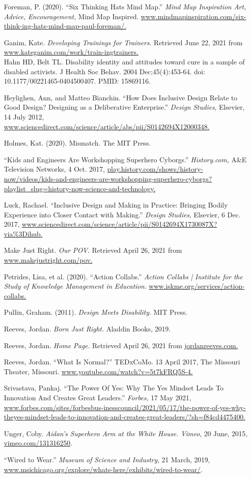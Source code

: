 \documentclass[11.5pt]{sig-alternate} %
\begin{document}
Foreman, P. (2020). “Six Thinking Hats Mind Map.” \textit{Mind Map Inspiration Art, Advice,  Encouragement,} Mind Map Inspired. \url{www.mindmapinspiration.com/six-think-ing-hats-mind-map-paul-foreman/.}

Ganim, Kate. \textit{Developing Trainings for Trainers.} Retrieved June 22, 2021 from \url{www.kateganim.com/work/train-ingtrainers.}\\

Hahn HD, Belt TL. Disability identity and attitudes toward cure in a sample of disabled activists. J Health Soc Behav. 2004 Dec;45(4):453-64. doi: 10.1177/00221465-0404500407. PMID: 15869116.

Heylighen, Ann, and Matteo Bianchin. “How Does Inclusive Design Relate to Good Design? Designing as a Deliberative Enterprise.” \textit{Design Studies,} Elsevier, 14 July 2012, \url{www.sciencedirect.com/science/article/abs/pii/S0142694X12000348.}

Holmes, Kat. (2020). Mismatch. The MIT Press. 

“Kids and Engineers Are Workshopping Superhero Cyborgs.” \textit{History.com,} A\&E Television Networks, 4 Oct. 2017, \url{play.history.com/shows/history-now/videos/kids-and-engineers-are-workshopping-superhero-cyborgs?playlist\_slug=history-now-science-and-technology.}

Luck, Rachael. “Inclusive Design and Making in Practice: Bringing Bodily Experience into Closer Contact with Making.” \textit{Design Studies,} Elsevier, 6 Dec. 2017, \url{www.sciencedirect.com/science/article/pii/S0142694X1730087X?via\%3Dihub.}

Make Just Right. \textit{Our POV.} Retrieved April 26, 2021 from \url{www.makejustright.com/pov.}

Petrides, Lisa, et al. (2020). “Action Collabs.” \textit{Action Collabs | Institute for the Study of Knowledge Management in Education.} \url{www.iskme.org/services/action-collabs.} 

Pullin, Graham. (2011). \textit{Design Meets Disability.} MIT Press. 

Reeves, Jordan. \textit{Born Just Right.} Aladdin Books, 2019.

Reeves, Jordan. \textit{Home Page.} Retrieved April 26, 2021 from \url{jordanreeves.com.}

Reeves, Jordan. “What Is Normal?” TEDxCoMo. 13 April 2017, The Missouri Theater, Missouri. \url{www.youtube.com/watch?v=5t7kFRQ5S-4.}

Srivastava, Pankaj. “The Power Of Yes: Why The Yes Mindset Leads To Innovation And Creates Great Leaders.” \textit{Forbes,} 17 May 2021, 
\url{www.forbes.com/sites/forbesbus-inesscouncil/2021/05/17/the-power-of-yes-why-theyes-mindset-leads-to-innovation-and-creates-great-leaders/?sh=f84cd4475400.}

Unger, Coby. \textit{Aidan's Superhero Arm at the White House. Vimeo,} 20 June, 2015, \url{vimeo.com/131316250}.

“Wired to Wear.” \textit{Museum of Science and Industry,} 21 March, 2019, \url{www.msichicago.org/explore/whats-here/exhibits/wired-to-wear/}.
\end{document}
